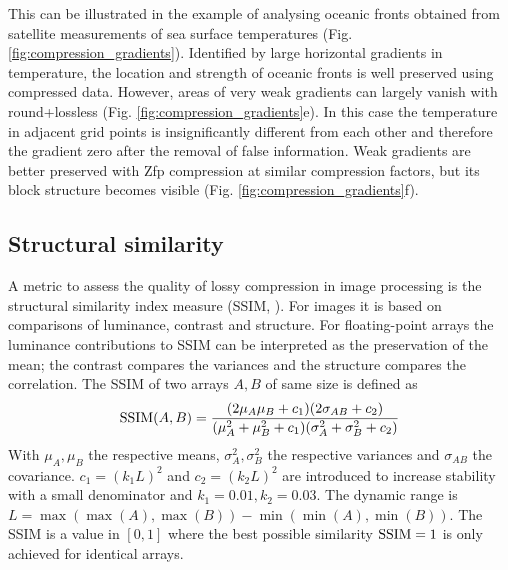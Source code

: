 This can be illustrated in the example of analysing oceanic fronts obtained from satellite measurements of sea surface
temperatures (Fig. \ref{fig:compression_gradients}). Identified by large horizontal gradients in temperature, the location
and strength of oceanic fronts is well preserved using compressed data. However, areas of very weak gradients can
largely vanish with round+lossless (Fig.  \ref{fig:compression_gradients}e). In this case the temperature in adjacent grid
points is insignificantly different from each other and therefore the gradient zero after the removal of false information.
Weak gradients are better preserved with Zfp compression at similar compression factors, but its block structure becomes
visible (Fig. \ref{fig:compression_gradients}f). 

\subsection{Structural similarity}

A metric to assess the quality of lossy compression in image processing is the structural similarity index measure (SSIM, \cite{Wang2004}).
For images it is based on comparisons of luminance, contrast and structure. For floating-point arrays the luminance contributions
to SSIM can be interpreted as the preservation of the mean; the contrast compares the variances and the structure compares the
correlation. The SSIM of two arrays $A,B$ of same size is defined as
	\begin{equation}
	\operatorname{SSIM}(A,B) = \frac{(2\mu_A\mu_B + c_1)(2\sigma_{AB} + c_2)}{(\mu_A^2 + \mu_B^2 + c_1)(\sigma^2_A + \sigma^2_B + c_2)}
	\end{equation}
With $\mu_A,\mu_B$ the respective means, $\sigma^2_A,\sigma^2_B$ the respective variances and $\sigma_{AB}$ the covariance.
$c_1 = (k_1L)^2$ and $c_2 = (k_2L)^2$  are introduced to increase stability with a small denominator and $k_1 = 0.01, k_2 = 0.03$.
The dynamic range is $L = \max(\max(A),\max(B)) - \min(\min(A),\min(B))$. The SSIM is a value in $[0,1]$ where the best possible
similarity $\operatorname{SSIM}=1$ is only achieved for identical arrays.

